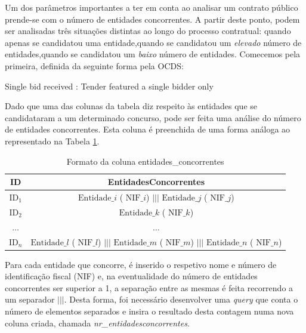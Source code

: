 Um dos parâmetros importantes a ter em conta ao analisar um contrato público prende-se com o número de entidades concorrentes. A partir deste ponto, podem ser analisadas três situações distintas ao longo do processo contratual: 
quando apenas se candidatou uma entidade,quando se candidatou um \textit{elevado} número de entidades,quando se candidatou um \textit{baixo} número de entidades. Comecemos pela primeira, definida da seguinte forma pela OCDS:

{Single bid received : Tender featured a single bidder only }


Dado que uma das colunas da tabela diz respeito às entidades que se candidataram a um determinado concurso, pode ser feita uma análise do número de entidades concorrentes. Esta coluna é preenchida de uma forma análoga ao representado na Tabela \ref{tab:entsconc}. 


\begin{table}[H]
	\centering
	\begin{tabular}{|c|c|}
		\hline
		\textbf{ID}   & \textbf{EntidadesConcorrentes}                                                                                                      \\ \hline
		$\text{ID}_1$ & $\text{Entidade}\_i$ ( $\text{NIF}\_i$) $|||$ $\text{Entidade}\_j$ ( $\text{NIF}\_j$)                                               \\ \hline
		$\text{ID}_2$ & $\text{Entidade}\_k$ ( $\text{NIF}\_k$)                                                                                             \\ \hline
		$\dots$       & $\dots$                                                                                                                             \\ \hline
		$\text{ID}_n$ & $\text{Entidade}\_l$ ( $\text{NIF}\_l$) $|||$ $\text{Entidade}\_m$ ( $\text{NIF}\_m$) $|||$ $\text{Entidade}\_n$ ( $\text{NIF}\_n$) \\ \hline
	\end{tabular}
	\caption{Formato da coluna entidades\_concorrentes}
	\label{tab:entsconc}
\end{table}

Para cada entidade que concorre, é inserido o respetivo nome e número de identificação fiscal (NIF) e, na eventualidade do número de entidades concorrentes ser superior a 1, a separação entre as mesmas é feita recorrendo a um separador $|||$. Desta forma, foi necessário desenvolver uma \textit{query} que conta o número de elementos separados e insira o resultado desta contagem numa nova coluna criada, chamada \textit{nr\_entidadesconcorrentes}.


